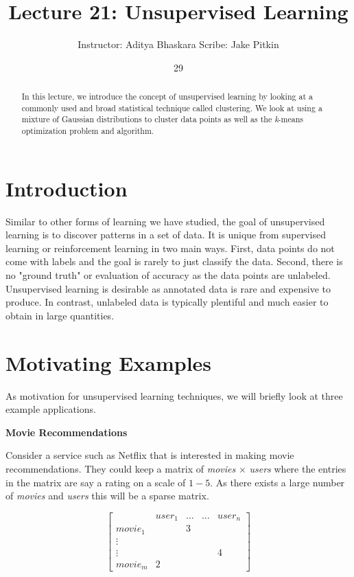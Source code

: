 \documentclass[english,course]{Notes}
\title{Lecture 21: Unsupervised Learning}
\author{Instructor: Aditya Bhaskara \qquad Scribe: Jake Pitkin}
\date{29}{03}{2017}
\begin{document}
\vspace{-10pt}
\begin{abstract}
In this lecture, we introduce the concept of unsupervised learning by looking at a commonly used and broad statistical technique called clustering. We look at using a mixture of Gaussian distributions to cluster data points as well as the \textit{k}-means optimization problem and algorithm.
\end{abstract}

\section{Introduction}

Similar to other forms of learning we have studied, the goal of unsupervised learning is to discover patterns in a set of data. It is unique from supervised learning or reinforcement learning in two main ways. First, data points do not come with labels and the goal is rarely to just classify the data. Second, there is no "ground truth" or evaluation of accuracy as the data points are unlabeled. Unsupervised learning is desirable as annotated data is rare and expensive to produce. In contrast, unlabeled data is typically plentiful and much easier to obtain in large quantities.

\section{Motivating Examples}

As motivation for unsupervised learning techniques, we will briefly look at three example applications.

\textbf{Movie Recommendations}

Consider a service such as Netflix that is interested in making movie recommendations. They could keep a matrix of \textit{movies} $\times$ \textit{users} where the entries in the matrix are say a rating on a scale of $1-5$. As there exists a large number of \textit{movies} and \textit{users} this will be a sparse matrix.

$$\begin{bmatrix}
  & user_1  & \dots & \dots & user_n\\
    movie_1 & & 3\\
    \vdots  \\
    \vdots  & & & & 4\\
    movie_m & 2
\end{bmatrix} $$ 
\end{document}
